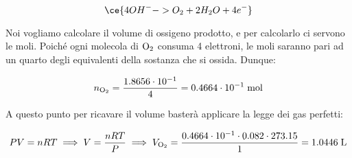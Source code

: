 \begin{equation*}
    \ce{4OH^- -> O_2 + 2H_2O + 4e^-}
\end{equation*}

Noi vogliamo calcolare il volume di ossigeno prodotto, e per calcolarlo ci servono le moli. Poiché ogni molecola di $\rm O_2$ consuma 4 elettroni, le moli saranno pari ad un quarto degli equivalenti della sostanza che si ossida. Dunque:

\begin{equation*}
    n_{\rm O_2}
    =\frac{1.8656 \cdot 10^{-1}}{4}
    =0.4664 \cdot 10^{-1} \; \rm mol
\end{equation*}

A questo punto per ricavare il volume basterà applicare la legge dei gas perfetti:

\begin{equation*}
    PV=nRT
    \implies
    V=\frac{nRT}{P}
    \implies
    V_{\rm O_2}=\frac{0.4664 \cdot 10^{-1} \cdot 0.082 \cdot 273.15}{1}
    =1.0446 \; \rm L
\end{equation*}